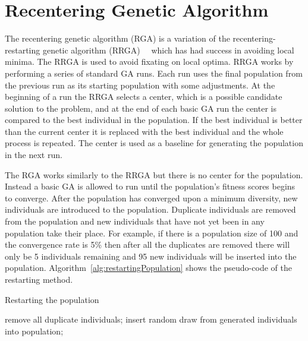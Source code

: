 \section{Recentering Genetic Algorithm}
\label{sec:rga}

The recentering genetic algorithm (RGA) is a variation of the recentering-restarting genetic algorithm (RRGA)~\cite{hughes2013recentering}~\cite{hughes2013edit} which has had success in avoiding local minima. The RRGA is used to avoid fixating on local optima. RRGA works by performing a series of standard GA runs. Each run uses the final population from the previous run as its starting population with some adjustments. At the beginning of a run the RRGA selects a center, which is a possible candidate solution to the problem, and at the end of each basic GA run the center is compared to the best individual in the population. If the best individual is better than the current center it is replaced with the best individual and the whole process is repeated. The center is used as a baseline for generating the population in the next run.

The RGA works similarly to the RRGA but there is no center for the population. Instead a basic GA is allowed to run until the population's fitness scores begins to converge. After the population has converged upon a minimum diversity, new individuals are introduced to the population. Duplicate individuals are removed from the population and new individuals that have not yet been in any population take their place. For example, if there is a population size of 100 and the convergence rate is 5\% then after all the duplicates are removed there will only be 5 individuals remaining and 95 new individuals will be inserted into the population. Algorithm~\ref{alg:restartingPopulation} shows the pseudo-code of the restarting method.

\begin{algorithm}[H]
\caption{Restarting the population}
\label{alg:restartingPopulation}
\begin{algorithmic}

  \STATE remove all duplicate individuals;
    \STATE insert random draw from generated individuals into population;
  \ENDWHILE
\ENDIF

\end{algorithmic}
\end{algorithm}